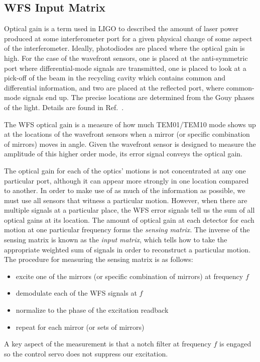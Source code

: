 


\subsection{WFS Input Matrix}
Optical gain is a term used in LIGO to described the amount of laser
power produced at some interferometer port for a given physical change
of some aspect of the interferometer. Ideally, photodiodes are placed
where the optical gain is high. For the case of the wavefront sensors,
one is placed at the anti-symmetric port where differential-mode
signals are transmitted, one is placed to look at a pick-off of the
beam in the recycling cavity which contains common and differential
information, and two are placed at the reflected port, where
common-mode signals end up. The precise locations are determined from
the Gouy phases of the light. Details are found in
Ref.~\cite{Barsotti2009Modeling}. 

The WFS optical gain is a measure of how much TEM01/TEM10 mode shows
up at the locations of the wavefront sensors when a mirror (or
specific combination of mirrors) moves in angle. Given the wavefront
sensor is designed to measure the amplitude of this higher order mode,
its error signal conveys the optical gain.

The optical gain for each of the optics' motions is not concentrated
at any one particular port, although it can appear more strongly in
one location compared to another. In order to make use of as much of
the information as possible, we must use all sensors that witness a
particular motion. However, when there are multiple signals at a
particular place, the WFS error signals tell us the sum of all optical
gains at its location. The amount of optical gain at each detector for
each motion at one particular frequency forms the \emph{sensing
  matrix}. The inverse of the sensing matrix is known as the
\emph{input matrix}, which tells how to take the appropriate weighted
sum of signals in order to reconstruct a particular motion. The
procedure for measuring the sensing matrix is as follows:
\begin{itemize}
\item excite one of the mirrors (or specific combination of mirrors)
  at frequency $f$ \vspace{-10pt}
\item demodulate each of the WFS signals at $f$ \vspace{-10pt}
\item normalize to the phase of the excitation readback \vspace{-10pt}
\item repeat for each mirror (or sets of mirrors)
\end{itemize}
A key aspect of the measurement is that a notch filter at frequency
$f$ is engaged so the control servo does not suppress our excitation.

